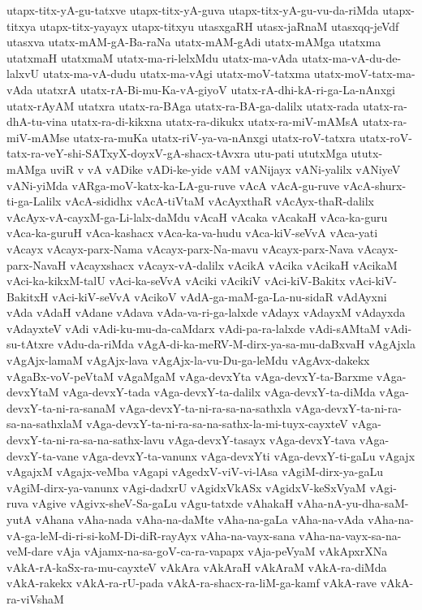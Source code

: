 {utapx-titx-yA-gu-tatxve
utapx-titx-yA-guva
utapx-titx-yA-gu-vu-da-riMda
utapx-titxya
utapx-titx-yayayx
utapx-titxyu
utasxgaRH
utasx-jaRnaM
utasxqq-jeVdf
utasxva
utatx-mAM-gA-Ba-raNa
utatx-mAM-gAdi
utatx-mAMga
utatxma
utatxmaH
utatxmaM
utatx-ma-ri-lelxMdu
utatx-ma-vAda
utatx-ma-vA-du-de-lalxvU
utatx-ma-vA-dudu
utatx-ma-vAgi
utatx-moV-tatxma
utatx-moV-tatx-ma-vAda
utatxrA
utatx-rA-Bi-mu-Ka-vA-giyoV
utatx-rA-dhi-kA-ri-ga-La-nAnxgi
utatx-rAyAM
utatxra
utatx-ra-BAga
utatx-ra-BA-ga-dalilx
utatx-rada
utatx-ra-dhA-tu-vina
utatx-ra-di-kikxna
utatx-ra-dikukx
utatx-ra-miV-mAMsA
utatx-ra-miV-mAMse
utatx-ra-muKa
utatx-riV-ya-va-nAnxgi
utatx-roV-tatxra
utatx-roV-tatx-ra-veY-shi-SATxyX-doyxV-gA-shacx-tAvxra
utu-pati
ututxMga
ututx-mAMga
uviR
v
vA
vADike
vADi-ke-yide
vAM
vANijayx
vANi-yalilx
vANiyeV
vANi-yiMda
vARga-moV-katx-ka-LA-gu-ruve
vAcA
vAcA-gu-ruve
vAcA-shurx-ti-ga-Lalilx
vAcA-sididhx
vAcA-tiVtaM
vAcAyxthaR
vAcAyx-thaR-dalilx
vAcAyx-vA-cayxM-ga-Li-lalx-daMdu
vAcaH
vAcaka
vAcakaH
vAca-ka-guru
vAca-ka-guruH
vAca-kashacx
vAca-ka-va-hudu
vAca-kiV-seVvA
vAca-yati
vAcayx
vAcayx-parx-Nama
vAcayx-parx-Na-mavu
vAcayx-parx-Nava
vAcayx-parx-NavaH
vAcayxshacx
vAcayx-vA-dalilx
vAcikA
vAcika
vAcikaH
vAcikaM
vAci-ka-kikxM-talU
vAci-ka-seVvA
vAciki
vAcikiV
vAci-kiV-Bakitx
vAci-kiV-BakitxH
vAci-kiV-seVvA
vAcikoV
vAdA-ga-maM-ga-La-nu-sidaR
vAdAyxni
vAda
vAdaH
vAdane
vAdava
vAda-va-ri-ga-lalxde
vAdayx
vAdayxM
vAdayxda
vAdayxteV
vAdi
vAdi-ku-mu-da-caMdarx
vAdi-pa-ra-lalxde
vAdi-sAMtaM
vAdi-su-tAtxre
vAdu-da-riMda
vAgA-di-ka-meRV-M-dirx-ya-sa-mu-daBxvaH
vAgAjxla
vAgAjx-lamaM
vAgAjx-lava
vAgAjx-la-vu-Du-ga-leMdu
vAgAvx-dakekx
vAgaBx-voV-peVtaM
vAgaMgaM
vAga-devxYta
vAga-devxY-ta-Barxme
vAga-devxYtaM
vAga-devxY-tada
vAga-devxY-ta-dalilx
vAga-devxY-ta-diMda
vAga-devxY-ta-ni-ra-sanaM
vAga-devxY-ta-ni-ra-sa-na-sathxla
vAga-devxY-ta-ni-ra-sa-na-sathxlaM
vAga-devxY-ta-ni-ra-sa-na-sathx-la-mi-tuyx-cayxteV
vAga-devxY-ta-ni-ra-sa-na-sathx-lavu
vAga-devxY-tasayx
vAga-devxY-tava
vAga-devxY-ta-vane
vAga-devxY-ta-vanunx
vAga-devxYti
vAga-devxY-ti-gaLu
vAgajx
vAgajxM
vAgajx-veMba
vAgapi
vAgedxV-viV-vi-lAsa
vAgiM-dirx-ya-gaLu
vAgiM-dirx-ya-vanunx
vAgi-dadxrU
vAgidxVkASx
vAgidxV-keSxVyaM
vAgi-ruva
vAgive
vAgivx-sheV-Sa-gaLu
vAgu-tatxde
vAhakaH
vAha-nA-yu-dha-saM-yutA
vAhana
vAha-nada
vAha-na-daMte
vAha-na-gaLa
vAha-na-vAda
vAha-na-vA-ga-leM-di-ri-si-koM-Di-diR-rayAyx
vAha-na-vayx-sana
vAha-na-vayx-sa-na-veM-dare
vAja
vAjamx-na-sa-goV-ca-ra-vapapx
vAja-peVyaM
vAkApxrXNa
vAkA-rA-kaSx-ra-mu-cayxteV
vAkAra
vAkAraH
vAkAraM
vAkA-ra-diMda
vAkA-rakekx
vAkA-ra-rU-pada
vAkA-ra-shacx-ra-liM-ga-kamf
vAkA-rave
vAkA-ra-viVshaM
}
